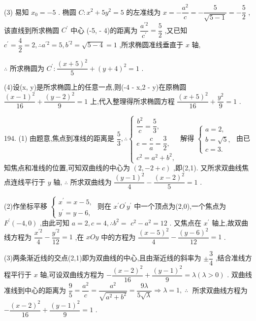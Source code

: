 (3) 易知 ${x}_{0} =  - 5$ . 椭圆 $C : {x}^{2} + 5{y}^{2} = 5$ 的左准线为 $x =  - \dfrac{{a}^{2}}{c} =  - \dfrac{5}{\sqrt{5 - 1}} =  - \dfrac{5}{2}$ ,该直线到所求椭圆 ${C}^{\prime }$ 中心 (-5, - 4)的距离为 $\dfrac{{a}^{\prime 2}}{{c}^{\prime }} = \dfrac{5}{2}$ ,又已知 ${c}^{\prime } = \dfrac{4}{2} = 2,\therefore {a}^{\prime 2} = 5,{b}^{\prime 2} = \sqrt{5 - 4} = 1$ ,所求椭圆准线垂直于 $x$ 轴,

$\therefore$ 所求椭圆为 ${C}^{\prime } : \dfrac{{\left( x + 5\right) }^{2}}{5} + {\left( y + 4\right) }^{2} = 1$ .

(4)设(x, y)是所求椭圆上的任意一点,则(-4 - x,2 - y)在原椭圆 $\dfrac{{\left( x - 1\right) }^{2}}{16} + \dfrac{{\left( y - 2\right) }^{2}}{9} = 1$ 上,代入整理得所求椭圆方程 $\dfrac{{\left( x + 5\right) }^{2}}{16} + \dfrac{{y}^{2}}{9} = 1$ .

194. (1) 由题意,焦点到准线的距离是 $\dfrac{5}{3},\therefore \left\{  \begin{array}{l} \dfrac{{b}^{2}}{c} = \dfrac{5}{3}, \\  e = \dfrac{c}{a} = \dfrac{3}{2}, \\  {c}^{2} = {a}^{2} + {b}^{2}, \end{array}\right.$ 解得 $\left\{  \begin{array}{l} a = 2, \\  b = \sqrt{5}, \\  c = 3. \end{array}\right.$ 由已知焦点和准线的位置,可知双曲线的中心为 $\left( {2, - 2 + c}\right)$ ,即(2,1). 又所求双曲线焦点连线平行于 $y$ 轴, $\therefore$ 所求双曲线为 $\dfrac{{\left( y - 1\right) }^{2}}{4} - \dfrac{{\left( x - 2\right) }^{2}}{5} = 1$ .

(2)作坐标平移 $\left\{  \begin{array}{l} {x}^{\prime } = x - 5, \\  {y}^{\prime } = y - 6, \end{array}\right.$ 则在 ${x}^{\prime }{O}^{\prime }{y}^{\prime }$ 中一个顶点为(2,0),一个焦点为 ${F}^{\prime }\left( {-4,0}\right)$ ,由此可知 $a = 2,c = 4,\therefore {b}^{2} =$  ${c}^{2} - {a}^{2} = {12}$ . 又焦点在 ${x}^{\prime }$ 轴上,故双曲线方程为 $\dfrac{{x}^{\prime 2}}{4} - \dfrac{{y}^{\prime 2}}{12} = 1$ ,在 ${xOy}$ 中的方程为 $\dfrac{{\left( x - 5\right) }^{2}}{4} - \dfrac{{\left( y - 6\right) }^{2}}{12} = 1$ .

(3)两条渐近线的交点(2,1)即为双曲线的中心,且由渐近线的斜率为 $\pm  \dfrac{3}{4}$ ,结合准线方程平行于 $x$ 轴,可设双曲线方程为 $- \dfrac{{\left( x - 2\right) }^{2}}{16} + \dfrac{{\left( y - 1\right) }^{2}}{9} = \lambda \left( {\lambda  > 0}\right)$ . 双曲线准线到中心的距离为 $\dfrac{9}{5} = \dfrac{{a}^{2}}{c} = \dfrac{{a}^{2}}{\sqrt{{a}^{2} + {b}^{2}}} = \dfrac{9\lambda }{5\sqrt{\lambda }} \Rightarrow  \lambda  = 1,\;\therefore \;$ 所求双曲线方程为 $- \dfrac{{\left( x - 2\right) }^{2}}{16} + \dfrac{{\left( y - 1\right) }^{2}}{9} = 1$ .

